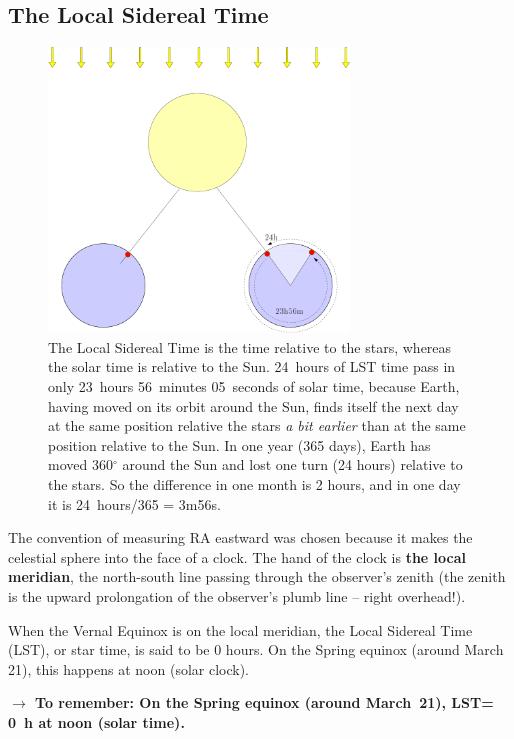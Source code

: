 \subsection{The Local Sidereal Time}

\begin{figure}[ht]
\begin{center}
 \includegraphics[width=8cm]{../figures/lst.pdf}
\end{center}
\caption{The Local Sidereal Time is the time relative to the stars, whereas the 
solar time is relative to the Sun. 24~hours of LST time pass in only 
23~hours 56~minutes 05~seconds of solar time, because Earth, having 
moved on its orbit around the Sun, finds itself the next day at the same position 
relative the stars {\em a bit earlier} than at the same position relative
to the Sun. 
In one year (365 days), Earth has moved 360$^\circ$ around the Sun and lost one 
turn (24 hours) relative to the stars. So the difference in one month is 2 hours, and in one day it is 24~hours/365 = 
3m56s.
}
\label{figlst}
\end{figure}

The convention of measuring RA eastward was chosen
because it makes the celestial sphere into the face of a clock. 
The hand of the clock is {\bf the local meridian}, 
the north-south line passing through the observer's zenith 
(the zenith is the upward prolongation of the observer's plumb line --
right overhead!). 

When the Vernal Equinox is on the local meridian, the Local Sidereal
Time (LST), or star time, is said to be 0 hours. 
On the Spring equinox (around March 21), this happens at noon (solar clock). 

{\bf$\rightarrow$ To remember: On the Spring equinox (around March~21), LST= 0~h at noon (solar time).}


